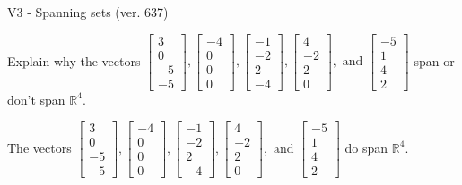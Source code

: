 \begin{exercise}
  \begin{exerciseTitle}V3 - Spanning sets (ver. 637)\end{exerciseTitle}
  \begin{exerciseStatement}
    Explain why the vectors \(\left[\begin{array}{r}
3 \\
0 \\
-5 \\
-5
\end{array}\right] , \left[\begin{array}{r}
-4 \\
0 \\
0 \\
0
\end{array}\right] , \left[\begin{array}{r}
-1 \\
-2 \\
2 \\
-4
\end{array}\right] , \left[\begin{array}{r}
4 \\
-2 \\
2 \\
0
\end{array}\right] , \text{ and } \left[\begin{array}{r}
-5 \\
1 \\
4 \\
2
\end{array}\right]\) span or don't span \(\mathbb{R}^4\). 
	


  \end{exerciseStatement}
  \begin{exerciseAnswer}
   The vectors \(\left[\begin{array}{r}
3 \\
0 \\
-5 \\
-5
\end{array}\right] , \left[\begin{array}{r}
-4 \\
0 \\
0 \\
0
\end{array}\right] , \left[\begin{array}{r}
-1 \\
-2 \\
2 \\
-4
\end{array}\right] , \left[\begin{array}{r}
4 \\
-2 \\
2 \\
0
\end{array}\right] , \text{ and } \left[\begin{array}{r}
-5 \\
1 \\
4 \\
2
\end{array}\right]\) 
  	 do  
	span \(\mathbb{R}^4\).
  



\end{exerciseAnswer}
\end{exercise}
